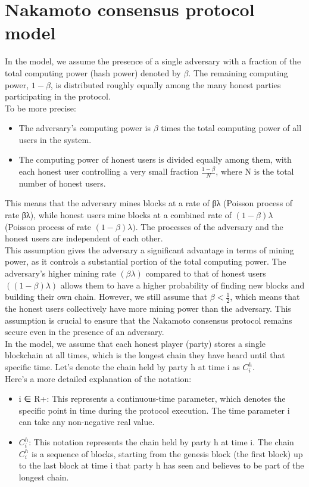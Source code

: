 \documentclass{report}
\begin{document}
\section{Nakamoto consensus protocol model}
In the model, we assume the presence of a single adversary with a fraction of the total computing power (hash power) denoted by $\beta$. The remaining computing power, $1 - \beta$, is distributed roughly equally among the many honest parties participating in the protocol.\\
To be more precise:
\begin{itemize}
	\item The adversary's computing power is $\beta$ times the total computing power of all users in the system.
	\item The computing power of honest users is divided equally among them, with each honest user controlling a very small fraction $\frac{1 - \beta}{N}$, where N is the total number of honest users. 
\end{itemize}
This means that the adversary mines blocks at a rate of βλ (Poisson process of rate βλ), while honest users mine blocks at a combined rate of $(1 - \beta)\lambda$ (Poisson process of rate $(1 - \beta)\lambda)$. The processes of the adversary and the honest users are independent of each other.\\
This assumption gives the adversary a significant advantage in terms of mining power, as it controls a substantial portion of the total computing power. The adversary's higher mining rate $(\beta\lambda)$ compared to that of honest users $((1 - \beta)\lambda)$ allows them to have a higher probability of finding new blocks and building their own chain. However, we still assume that $\beta < \frac{1}{2}$, which means that the honest users collectively have more mining power than the adversary. This assumption is crucial to ensure that the Nakamoto consensus protocol remains secure even in the presence of an adversary.\\
In the model, we assume that each honest player (party) stores a single blockchain at all times, which is the longest chain they have heard until that specific time. Let's denote the chain held by party h at time i as $C_{i}^{h}$.\\
Here's a more detailed explanation of the notation:\\
\begin{itemize}
	\item i ∈ R+: This represents a continuous-time parameter, which denotes the specific point in time during the protocol execution. The time parameter i can take any non-negative real value.
	\item $C_{i}^{h}$: This notation represents the chain held by party h at time i. The chain $C_{i}^{h}$ is a sequence of blocks, starting from the genesis block (the first block) up to the last block at time i that party h has seen and believes to be part of the longest chain.
\end{itemize}
\end{document}
